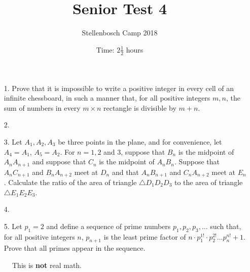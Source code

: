\documentclass[a4paper, 12pt]{article}
\title{Senior Test 4}
\author{Stellenbosch Camp 2018}
\date{Time: $2 \frac{1}{2}$ hours}
\begin{document}
 \maketitle

\begin{enumerate}

\item[1.]  Prove that it is impossible to write a positive integer in every cell of an infinite chessboard, in such a manner that, for all positive integers $m, n$, the sum of numbers in every $m\times n$ rectangle is divisible by $m + n$.


\vspace{7pt}

% 
\item[2.] 


\vspace{5pt}

\item[3.]  
Let $A_1, A_2, A_3$ be three points in the plane, and for convenience, let $A_4 = A_1$, $A_5 = A_2$. For $n = 1, 2$ and $3$, suppose that $B_n$ is the midpoint of $A_n A_{n+1}$ and suppose that $C_n$ is the midpoint of $A_n B_n$. Suppose that $A_n C_{n+1}$ and $B_n A_{n+2}$ meet at $D_n$ and that $A_n B_{n+1}$ and $C_n A_{n+2}$ meet at $E_n$. Calculate the ratio of the area of triangle $\triangle D_1 D_2 D_3$ to the area of triangle $\triangle E_1 E_2 E_3$.


\vspace{7pt}

\item[4.]


\vspace{7pt}

\item[5.]   Let $p_1 = 2$ and define a sequence of prime numbers $p_1, p_2, p_3, \dots$ such that, for all positive integers $n$, $p_{n+1}$ is the least prime factor of $n \cdot p_1^{1!} \cdot p_2^{2!} \dots p_n^{n!} + 1$. Prove that all primes appear in the sequence.



\end{enumerate}

\vfill

\begin{figure}[h]
	\centering
{}
\caption{This is \textbf{not} real math.}
\end{figure}

\vspace{12mm}
\end{document}

